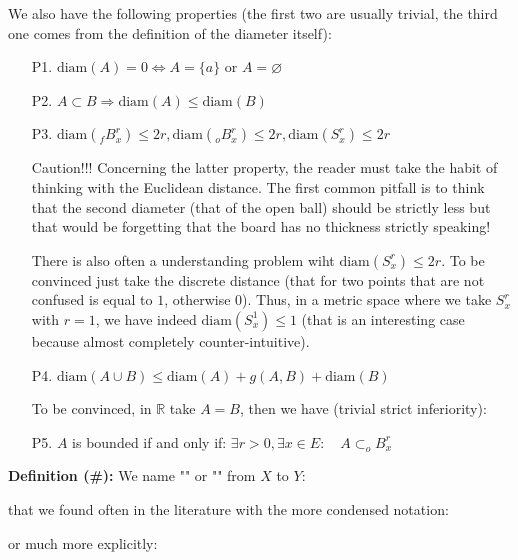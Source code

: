 	We also have the following properties (the first two are usually trivial, the third one comes from the definition of the diameter itself):
	\begin{enumerate}
		\item[P1.] $\text{diam}(A)=0 \Leftrightarrow A=\{a\}$ or $A=\varnothing$
		
		\item[P2.] $A\subset B \Rightarrow \text{diam}(A)\leq \text{diam}(B)$
		
		\item[P3.] $\text{diam}(_fB_x^r)\leq 2r,\text{diam}(_oB_x^r)\leq 2r,\text{diam}(S_x^r)\leq 2r$
		
		Caution!!! Concerning the latter property, the reader must take the habit of thinking with the Euclidean distance. The first common pitfall is to think that the second diameter (that of the open ball) should be strictly less but that would be forgetting that the board has no thickness strictly speaking!
	
		There is also often a understanding problem wiht $\text{diam}(S_x^r)\leq 2r$. To be convinced just take the discrete distance (that for two points that are not confused is equal to $1$, otherwise $0$). Thus, in a metric space where we take $S_x^r$ with $r=1$, we have indeed $\text{diam}(S_x^1)\leq 1$ (that is an interesting case because almost completely counter-intuitive).
		
		\item[P4.] $\text{diam}(A\cup B)\leq \text{diam}(A)+g(A,B)+\text{diam}(B)$
		
		To be convinced, in $\mathbb{R}$ take $A=B$, then we have (trivial strict inferiority):
		
		
		\item[P5.] $A$ is bounded if and only if: $\exists r>0,\exists x\in E:\quad A\subset _oB_x^r$
	\end{enumerate}

	\textbf{Definition (\#\mydef):} We name "" or "" from $X$ to $Y$:
	
	that we found often in the literature with the more condensed notation:
	
	or much more explicitly:
	

